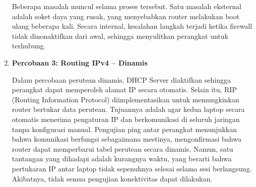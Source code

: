 \begin{enumerate}
    Beberapa masalah muncul selama proses tersebut. Satu masalah eksternal 
    adalah soket daya yang rusak, yang menyebabkan router melakukan boot 
    ulang beberapa kali. Secara internal, kesalahan langkah terjadi ketika 
    firewall tidak dinonaktifkan dari awal, sehingga menyulitkan perangkat 
    untuk terhubung.

    \item \textbf{Percobaan 3: Routing IPv4 -- Dinamis}
    
    Dalam percobaan perutean dinamis, DHCP Server diaktifkan sehingga 
    perangkat dapat memperoleh alamat IP secara otomatis. Selain itu, RIP 
    (Routing Information Protocol) diimplementasikan untuk memungkinkan 
    router bertukar data perutean. Tujuannya adalah agar kedua laptop secara 
    otomatis menerima pengaturan IP dan berkomunikasi di seluruh jaringan 
    tanpa konfigurasi manual. Pengujian ping antar perangkat menunjukkan 
    bahwa komunikasi berfungsi sebagaimana mestinya, mengonfirmasi bahwa 
    router dapat memperbarui tabel perutean secara dinamis.
    Namun, satu tantangan yang dihadapi adalah kurangnya waktu, yang berarti 
    bahwa pertukaran IP antar laptop tidak sepenuhnya selesai selama sesi 
    berlangsung. Akibatnya, tidak semua pengujian konektivitas dapat 
    dilakukan.
\end{enumerate}

